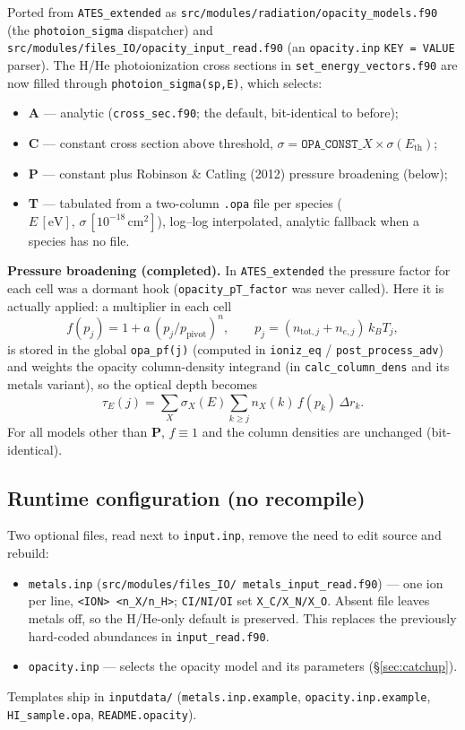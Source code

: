 \documentclass[english,a4paper]{my_memo}
\begin{document}
Ported from \texttt{ATES\_extended} as
\texttt{src/modules/radiation/opacity\_models.f90} (the
\texttt{photoion\_sigma} dispatcher) and
\texttt{src/modules/files\_IO/opacity\_input\_read.f90} (an
\texttt{opacity.inp} \texttt{KEY = VALUE} parser).  The H/He
photoionization cross sections in \texttt{set\_energy\_vectors.f90} are
now filled through \texttt{photoion\_sigma(sp,E)}, which selects:
\begin{itemize}
  \item \textbf{A} --- analytic (\texttt{cross\_sec.f90}; the default,
    bit-identical to before);
  \item \textbf{C} --- constant cross section above threshold,
    \(\sigma = \texttt{OPA\_CONST\_}X\times\sigma(E_\mathrm{th})\);
  \item \textbf{P} --- constant plus Robinson \& Catling (2012)
    pressure broadening (below);
  \item \textbf{T} --- tabulated from a two-column
    \texttt{.opa} file per species (\(E\,[\mathrm{eV}],\,\sigma\,[10^{-18}\,
    \mathrm{cm}^2]\)), log--log interpolated, analytic fallback when a
    species has no file.
\end{itemize}

\textbf{Pressure broadening (completed).}  In \texttt{ATES\_extended}
the pressure factor for each cell was a dormant hook
(\texttt{opacity\_pT\_factor} was never called).  Here it is actually
applied: a multiplier in each cell
\[
  f(p_j) = 1 + a\,(p_j/p_\mathrm{pivot})^{n},
  \qquad p_j = (n_{\mathrm{tot},j}+n_{e,j})\,k_B T_j,
\]
is stored in the global \texttt{opa\_pf(j)} (computed in
\texttt{ioniz\_eq} / \texttt{post\_process\_adv}) and weights the opacity
column-density integrand (in \texttt{calc\_column\_dens} and its metals
variant), so the optical depth becomes
\[
  \tau_E(j)=\sum_X \sigma_X(E)\sum_{k\ge j} n_X(k)\,f(p_k)\,\Delta r_k .
\]
For all models other than \textbf{P}, \(f\equiv 1\) and the column
densities are unchanged (bit-identical).

\subsection{Runtime configuration (no recompile)}

Two optional files, read next to \texttt{input.inp}, remove the need to
edit source and rebuild:
\begin{itemize}
  \item \texttt{metals.inp} (\texttt{src/modules/files\_IO/%
    metals\_input\_read.f90}) --- one ion per line,
    \texttt{<ION> <n\_X/n\_H>}; \texttt{CI/NI/OI} set
    \texttt{X\_C/X\_N/X\_O}.  Absent file leaves metals off, so the
    H/He-only default is preserved.  This replaces the previously
    hard-coded abundances in \texttt{input\_read.f90}.
  \item \texttt{opacity.inp} --- selects the opacity model and its
    parameters (\S\ref{sec:catchup}).
\end{itemize}
\begin{sloppypar}
Templates ship in \texttt{inputdata/} (\texttt{metals.inp.example},
\texttt{opacity.inp.example}, \texttt{HI\_sample.opa},
\texttt{README.opacity}).
\end{sloppypar}
\end{document}
